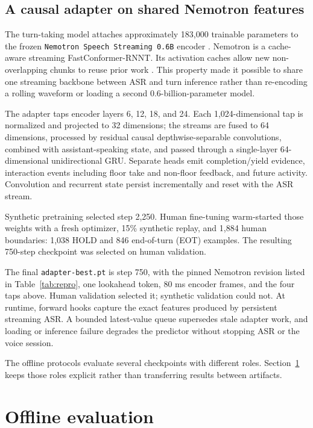 \documentclass[10pt,twocolumn]{article}
\newcommand{\code}[1]{\texttt{#1}}
\begin{document}
\subsection{A causal adapter on shared Nemotron features}

The turn-taking model attaches approximately 183,000 trainable parameters to the frozen
\code{Nemotron Speech Streaming 0.6B} encoder \cite{nemotron}. Nemotron is a cache-aware streaming
FastConformer-RNNT. Its activation caches allow new non-overlapping chunks to reuse prior work
\cite{fastconformer,stateful}. This property made it possible to share one streaming backbone
between ASR and turn inference rather than re-encoding a rolling waveform or loading a second
0.6-billion-parameter model.

The adapter taps encoder layers 6, 12, 18, and 24. Each 1,024-dimensional tap is normalized and
projected to 32 dimensions; the streams are fused to 64 dimensions, processed by residual causal
depthwise-separable convolutions, combined with assistant-speaking state, and passed through a
single-layer 64-dimensional unidirectional GRU. Separate heads emit completion/yield evidence,
interaction events including floor take and non-floor feedback, and future activity. Convolution
and recurrent state persist incrementally and reset with the ASR stream.

Synthetic pretraining selected step 2,250. Human fine-tuning warm-started those weights with a fresh
optimizer, 15\% synthetic replay, and 1,884 human boundaries: 1,038 HOLD and 846 end-of-turn (EOT)
examples. The resulting 750-step checkpoint was selected on human validation.

The final \code{adapter-best.pt} is step 750, with the pinned Nemotron revision listed in
Table~\ref{tab:repro}, one lookahead token, 80 ms encoder frames, and the four taps above. Human
validation selected it; synthetic validation could not. At runtime, forward
hooks capture the exact features produced by persistent streaming ASR. A bounded latest-value queue
supersedes stale adapter work, and loading or inference failure degrades the predictor without
stopping ASR or the voice session.

The offline protocols evaluate several checkpoints with different roles. Section~\ref{sec:offline-results}
keeps those roles explicit rather than transferring results between artifacts.

\section{Offline evaluation}
\label{sec:offline-results}
\end{document}
